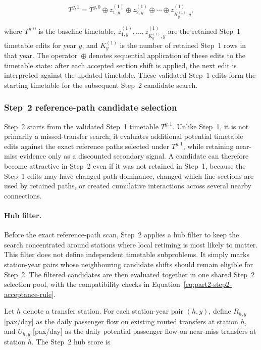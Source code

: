 \documentclass[preprint,12pt]{elsarticle}
\begin{document}
\begin{equation}
T^{y,1}
=
T^{y,0}
\oplus
z^{(1)}_{1,y}
\oplus
z^{(1)}_{2,y}
\oplus
\cdots
\oplus
z^{(1)}_{K_y^{(1)},y},
\label{eq:part2-step1-timetable}
\end{equation}

where \(T^{y,0}\) is the baseline timetable, \(z^{(1)}_{1,y},\ldots,z^{(1)}_{K_y^{(1)},y}\) are the retained Step~1 timetable edits for year \(y\), and \(K_y^{(1)}\) is the number of retained Step~1 rows in that year. The operator~\(\oplus\) denotes sequential application of these edits to the timetable state: after each accepted section shift is applied, the next edit is interpreted against the updated timetable. These validated Step~1 edits form the starting timetable for the subsequent Step~2 candidate search.


\subsubsection{Step~2 reference-path candidate selection}\label{sec:methods-part2-step2-search}

Step~2 starts from the validated Step~1 timetable \(T^{y,1}\). Unlike Step~1, it is not primarily a missed-transfer search; it evaluates additional potential timetable edits against the exact reference paths selected under \(T^{y,1}\), while retaining near-miss evidence only as a discounted secondary signal. A candidate can therefore become attractive in Step~2 even if it was not retained in Step~1, because the Step~1 edits may have changed path dominance, changed which line sections are used by retained paths, or created cumulative interactions across several nearby connections.
\paragraph*{Hub filter.}
Before the exact reference-path scan, Step~2 applies a hub filter to keep the search concentrated around stations where local retiming is most likely to matter. This filter does not define independent timetable subproblems. It simply marks station-year pairs whose neighbouring candidate shifts should remain eligible for Step~2. The filtered candidates are then evaluated together in one shared Step~2 selection pool, with the compatibility checks in Equation~\eqref{eq:part2-step2-acceptance-rule}.

Let \(h\) denote a transfer station. For each station-year pair \((h,y)\), define \(R_{h,y}\) [pax/day] as the daily passenger flow on existing routed transfers at station \(h\), and \(U_{h,y}\) [pax/day] as the daily potential passenger flow on near-miss transfers at station \(h\). The Step~2 hub score is
\end{document}
